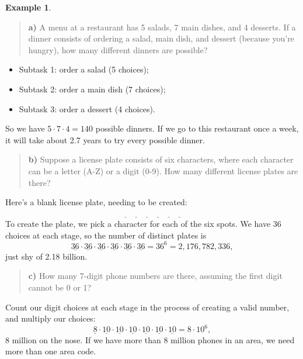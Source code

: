 \documentclass[
]{book}
\providecommand{\tightlist}{%
  \setlength{\itemsep}{0pt}\setlength{\parskip}{0pt}}
\theoremstyle{definition}
\theoremstyle{definition}
\newtheorem{example}{Example}[chapter]
\theoremstyle{definition}
\theoremstyle{definition}
\theoremstyle{remark}
\begin{document}
\begin{example}
\protect\hypertarget{exm:mult-principle}{}\label{exm:mult-principle}\leavevmode

\begin{quote}
\textbf{a)}
A menu at a restaurant has 5 salads, 7 main dishes, and 4 desserts. If a dinner consists of ordering a salad, main dish, and dessert (because you're hungry), how many different dinners are possible?
\end{quote}

\begin{itemize}
\tightlist
\item
  Subtask 1: order a salad (5 choices);
\item
  Subtask 2: order a main dish (7 choices);
\item
  Subtask 3: order a dessert (4 choices).
\end{itemize}

So we have \(5 \cdot 7 \cdot 4 = 140\) possible dinners. If we go to this restaurant once a week, it will take about 2.7 years to try every possible dinner.

\begin{quote}
\textbf{b)}
Suppose a license plate consists of six characters, where each character can be a letter (A-Z) or a digit (0-9). How many different license plates are there?
\end{quote}

Here's a blank license plate, needing to be created:

\[\underline{~~~} ~~~ \underline{~~~} ~~~ \underline{~~~} ~~~ \underline{~~~} ~~~ \underline{~~~} ~~~ \underline{~~~}\]
To create the plate, we pick a character for each of the six spots. We have 36 choices at each stage, so the number of distinct plates is \[\underline{36}\cdot \underline{36} \cdot \underline{36} \cdot \underline{36} \cdot \underline{36} \cdot \underline{36} = 36^6 = 2,176,782,336,\] just shy of 2.18 billion.

\begin{quote}
\textbf{c)}
How many 7-digit phone numbers are there, assuming the first digit cannot be 0 or 1?
\end{quote}

Count our digit choices at each stage in the process of creating a valid number, and multiply our choices:
\[\underline{8}\cdot \underline{10} \cdot \underline{10} \cdot \underline{10} \cdot \underline{10} \cdot \underline{10} \cdot \underline{10} = 8\cdot10^6,\] 8 million on the nose. If we have more than 8 million phones in an area, we need more than one area code.


\end{example}
\end{document}
